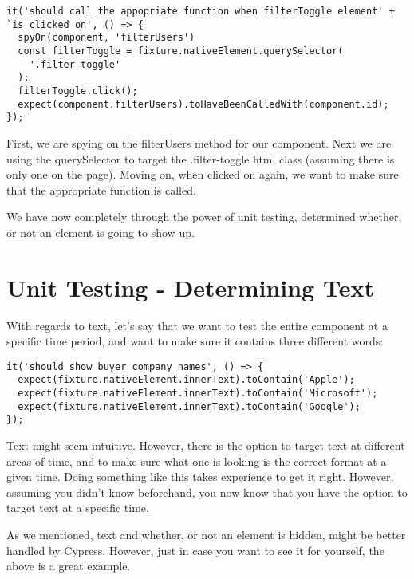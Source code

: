 \begin{lstlisting}
it('should call the appopriate function when filterToggle element' +
`is clicked on', () => {
  spyOn(component, 'filterUsers')
  const filterToggle = fixture.nativeElement.querySelector(
    '.filter-toggle'
  );
  filterToggle.click();
  expect(component.filterUsers).toHaveBeenCalledWith(component.id);
});
\end{lstlisting}

First, we are spying on the filterUsers method for our component. Next we are
using the querySelector to target the .filter-toggle html class (assuming there
is only one on the page). Moving on, when clicked on again, we want to make sure
that the appropriate function is called.

We have now completely through the power of unit testing, determined whether, or
not an element is going to show up.

\section{ Unit Testing - Determining Text }
With regards to text, let's say that we want to test the entire component at a
specific time period, and want to make sure it contains three different words:
\begin{lstlisting}
it('should show buyer company names', () => {
  expect(fixture.nativeElement.innerText).toContain('Apple');
  expect(fixture.nativeElement.innerText).toContain('Microsoft');
  expect(fixture.nativeElement.innerText).toContain('Google');
});
\end{lstlisting}

Text might seem intuitive. However, there is the option to target text at
different areas of time, and to make sure what one is looking is the correct
format at a given time. Doing something like this takes experience to get it
right. However, assuming you didn't know beforehand, you now know that you have
the option to target text at a specific time.

As we mentioned, text and whether, or not an element is hidden, might be better
handled by Cypress. However, just in case you want to see it for yourself, the
above is a great example.

